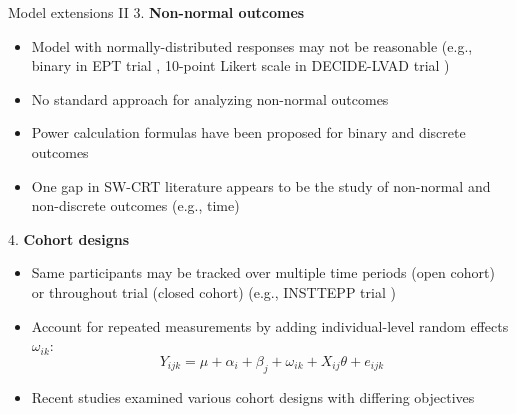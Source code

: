 \documentclass[9pt]{beamer}
\begin{document}
\begin{frame}{Model extensions II}
3. \textbf{Non-normal outcomes}
\begin{itemize}

\item
Model with normally-distributed responses may not be reasonable (e.g., binary in EPT trial \citep{Hussey:2007}, 10-point Likert scale in DECIDE-LVAD trial \citep{Allen:2018})

\item
No standard approach for analyzing non-normal outcomes

\item
Power calculation formulas have been proposed for binary and discrete outcomes \citep{Wang:2021,Xia:2021}

\item
One gap in SW-CRT literature appears to be the study of non-normal and non-discrete outcomes (e.g., time)

\end{itemize}
\vspace{2em}

4. \textbf{Cohort designs}
\begin{itemize}

\item
Same participants may be tracked over multiple time periods (open cohort) or throughout trial (closed cohort) (e.g., INSTTEPP trial \citep{Nease:2018})

\item
Account for repeated measurements by adding individual-level random effects $\omega_{ik}$:
\[
Y_{ijk} = \mu + \alpha_i + \beta_j + \omega_{ik} + X_{ij}\theta + e_{ijk}
\]

\item
Recent studies \citep{Hooper:2019,Kasza:2020,Li:2020} examined various cohort designs with differing objectives

\end{itemize}
\end{frame}
\end{document}
